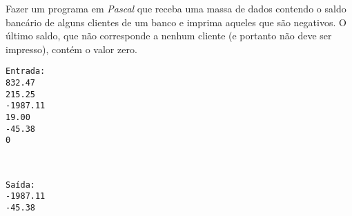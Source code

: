 
\item Fazer um programa em \emph{Pascal} que receba uma massa de dados
contendo o saldo bancário de alguns clientes de um banco
e imprima aqueles que são negativos. O último saldo, que não corresponde
a nenhum cliente (e portanto  não deve ser impresso), contém o valor
zero.

\begin{minipage}{5cm}
\begin{verbatim}
Entrada:
832.47
215.25
-1987.11
19.00
-45.38
0
\end{verbatim}
\end{minipage} \
\begin{minipage}{5cm}
\begin{verbatim}
Saída:
-1987.11
-45.38
\end{verbatim}
\end{minipage}


